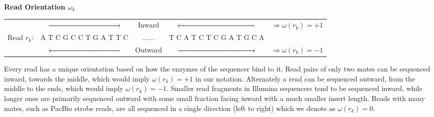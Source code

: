 \documentclass[phd,tocprelim]{cornell}
\begin{document}
\begin{center}
\textbf{Read Orientation $\omega_{k}$} \\
\begin{tabular}{ccccc} \\
 & $\xrightarrow{\hspace*{3.4cm}}$ & Inward & $\xleftarrow{\hspace*{3.7cm}}$ & $\Rightarrow \omega(r_{k}) = +1$ \\
 Read $r_{k}$: & {\color{red} A}{\color{blue} T}{\color{MyDarkGreen} C}{\color{orange} G}{\color{MyDarkGreen} C}{\color{MyDarkGreen} C}{\color{blue} T}{\color{orange} G}{\color{red} A}{\color{blue} T}{\color{blue} T}{\color{MyDarkGreen} C} & $\hdots\hdots$ & {\color{blue} T}{\color{MyDarkGreen} C}{\color{red} A}{\color{blue} T}{\color{MyDarkGreen} C}{\color{blue} T}{\color{MyDarkGreen} C}{\color{orange} G}{\color{red} A}{\color{blue} T}{\color{orange} G}{\color{MyDarkGreen} C}{\color{red} A} & \\
 & $\xleftarrow{\hspace*{3.4cm}}$ & Outward & $\xrightarrow{\hspace*{3.7cm}}$ & $\Rightarrow \omega(r_{k}) = -1$
\end{tabular}
\end{center}
Every read has a unique orientation based on how the enzymes of the sequencer bind to it. Read pairs of only two mates can be sequenced inward, towards the middle, which would imply $\omega(r_{k}) = +1$ in our notation. Alternately a read can be sequenced outward, from the middle to the ends, which would imply $\omega(r_{k}) = -1$. Smaller read fragments in Illumina sequencers tend to be sequenced inward, while longer ones are primarily sequenced outward with some small fraction facing inward with a much smaller insert length. Reads with many mates, such as PacBio strobe reads, are all sequenced in a single direction (left to right) which we denote as $\omega(r_{k}) = 0$.
\end{document}
